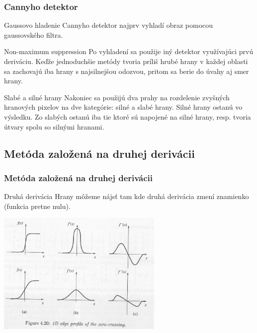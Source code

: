 \documentclass{beamer}
\begin{document}
\begin{frame}
\frametitle{Cannyho detektor}
  \begin{block}{Gaussovo hladenie}
  Cannyho detektor najprv vyhladí obraz pomocou gaussovského filtra.
  \end{block}    
  
  \begin{block}{Non-maximum suppression}
  Po vyhladení sa použije iný detektor využívajúci prvú deriváciu. Keďže jednoduchšie metódy tvoria príliš hrubé hrany v každej oblasti sa zachovajú iba hrany s najsilnejšou odozvou, pritom sa berie do úvahy aj smer hrany.
  \end{block}  
  
  \begin{block}{Slabé a silné hrany}
  Nakoniec sa použijú dva prahy na rozdelenie zvyšných hranových pixelov na dve kategórie: silné a slabé hrany. Silné hrany ostanú vo výsledku. Zo slabých ostanú iba tie ktoré sú napojené na silné hrany, resp. tvoria útvary spolu so silnými hranami.
  \end{block}
\end{frame}

\subsection{Metóda založená na druhej derivácii}

\begin{frame}
\frametitle{Metóda založená na druhej derivácii}
  \begin{block}{Druhá derivácia}
  Hrany môžeme nájsť tam kde druhá derivácia zmení znamienko (funkcia pretne nulu).
  \end{block}
    
  \begin{center}
  \includegraphics[width=0.6\textwidth]{zero-crossing.png}
  \end{center}
\end{frame}
\end{document}
